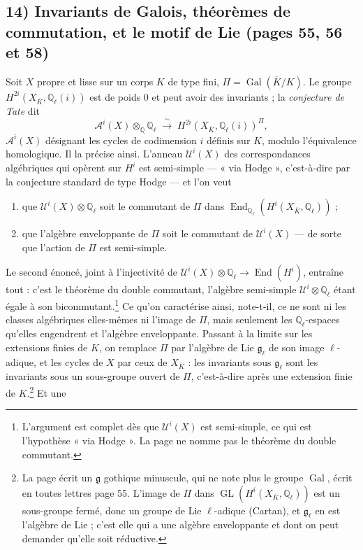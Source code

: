 \documentclass[11pt,a4paper]{article}
\begin{document}
\subsection*{14) Invariants de Galois, théorèmes de commutation, et le motif de Lie (pages 55, 56 et 58)}

Soit $X$ propre et lisse sur un corps $K$ de type fini, $\Pi =
\operatorname{Gal}(\overline{K}/K)$. Le groupe $H^{2i}(X_{\overline{K}},
\mathbb{Q}_{\ell}(i))$ est de poids $0$ et peut avoir des invariants ; la
\emph{conjecture de Tate} dit
\[
\mathcal{A}^{i}(X) \otimes_{\mathbb{Q}} \mathbb{Q}_{\ell} \;\xrightarrow{\ \sim\ }\;
H^{2i}(X_{\overline{K}}, \mathbb{Q}_{\ell}(i))^{\Pi} ,
\]
$\mathcal{A}^{i}(X)$ désignant les cycles de codimension $i$ définis sur $K$,
modulo l'équivalence homologique. Il la précise ainsi. L'anneau
$\mathcal{U}^{i}(X)$ des correspondances algébriques qui opèrent sur $H^{i}$ est
semi-simple --- « via Hodge », c'est-à-dire par la conjecture standard de type
Hodge --- et l'on veut
\begin{enumerate}
  \item que $\mathcal{U}^{i}(X) \otimes \mathbb{Q}_{\ell}$ soit le commutant de
  $\Pi$ dans $\operatorname{End}_{\mathbb{Q}_{\ell}}(H^{i}(X_{\overline{K}},
  \mathbb{Q}_{\ell}))$ ;
  \item que l'algèbre enveloppante de $\Pi$ soit le commutant de
  $\mathcal{U}^{i}(X)$ --- de sorte que l'action de $\Pi$ est semi-simple.
\end{enumerate}
Le second énoncé, joint à l'injectivité de $\mathcal{U}^{i}(X) \otimes
\mathbb{Q}_{\ell} \to \operatorname{End}(H^{i})$, entraîne tout : c'est le
théorème du double commutant, l'algèbre semi-simple $\mathcal{U}^{i} \otimes
\mathbb{Q}_{\ell}$ étant égale à son bicommutant.\footnote{L'argument est
complet dès que $\mathcal{U}^{i}(X)$ est semi-simple, ce qui est l'hypothèse
« via Hodge ». La page ne nomme pas le théorème du double commutant.} Ce qu'on
caractérise ainsi, note-t-il, ce ne sont ni les classes algébriques elles-mêmes
ni l'image de $\Pi$, mais seulement les $\mathbb{Q}_{\ell}$-espaces qu'elles
engendrent et l'algèbre enveloppante. Passant à la limite sur les extensions
finies de $K$, on remplace $\Pi$ par l'algèbre de Lie $\mathfrak{g}_{\ell}$ de
son image $\ell$-adique, et les cycles de $X$ par ceux de
$X_{\overline{K}}$ : les invariants sous $\mathfrak{g}_{\ell}$ sont les invariants
sous un sous-groupe ouvert de $\Pi$, c'est-à-dire après une extension finie de
$K$.\footnote{La page écrit un $\mathfrak{g}$ gothique minuscule, qui ne note
plus le groupe $\operatorname{Gal}$, écrit en toutes lettres page 55. L'image de
$\Pi$ dans $\operatorname{GL}(H^{i}(X_{\overline{K}}, \mathbb{Q}_{\ell}))$ est un
sous-groupe fermé, donc un groupe de Lie $\ell$-adique (Cartan), et
$\mathfrak{g}_{\ell}$ en est l'algèbre de Lie ; c'est elle qui a une algèbre
enveloppante et dont on peut demander qu'elle soit réductive.} Et une
\end{document}
